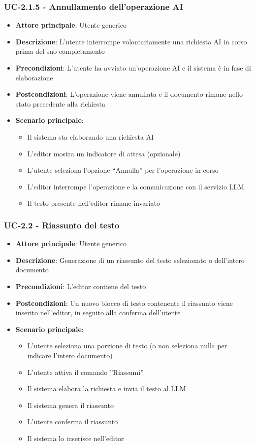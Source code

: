 \documentclass[11pt,a4paper]{article}
\begin{document}
\subsubsection{UC-2.1.5 - Annullamento dell’operazione AI}
\begin{itemize}
    \item \textbf{Attore principale}: Utente generico
    \item \textbf{Descrizione}: L’utente interrompe volontariamente una richiesta AI in corso prima del suo completamento
    \item \textbf{Precondizioni}: L'utente ha avviato un'operazione AI e il sistema è in fase di elaborazione
    \item \textbf{Postcondizioni}: L’operazione viene annullata e il documento rimane nello stato precedente alla richiesta
    \item \textbf{Scenario principale}:
    \begin{itemize}
        \item Il sistema sta elaborando una richiesta AI
        \item L’editor mostra un indicatore di attesa (opzionale)
        \item L’utente seleziona l’opzione “Annulla” per l’operazione in corso
        \item L’editor interrompe l’operazione e la comunicazione con il servizio LLM
        \item Il testo presente nell’editor rimane invariato
    \end{itemize}
\end{itemize}

\subsubsection{UC-2.2 - Riassunto del testo}
\begin{itemize}
    \item \textbf{Attore principale}: Utente generico
    \item \textbf{Descrizione}: Generazione di un riassunto del testo selezionato o dell’intero documento
    \item \textbf{Precondizioni}: L’editor contiene del testo
    \item \textbf{Postcondizioni}: Un nuovo blocco di testo contenente il riassunto viene inserito nell’editor, in seguito alla conferma dell'utente
    \item \textbf{Scenario principale}:
    \begin{itemize}
        \item L’utente seleziona una porzione di testo (o non seleziona nulla per indicare l'intero documento)
        \item L’utente attiva il comando ”Riassumi”
        \item Il sistema elabora la richiesta e invia il testo al LLM
        \item Il sistema genera il riassunto
        \item L'utente conferma il riassunto
        \item Il sistema lo inserisce nell'editor
    \end{itemize}
\end{itemize}
\end{document}
